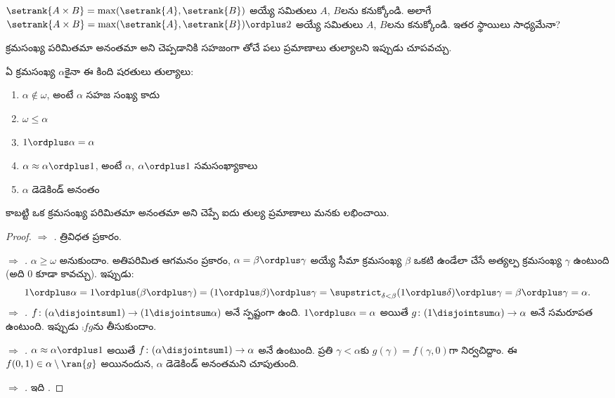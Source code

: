 \documentclass[../../../include/open-logic-section]{subfiles}
\begin{document}
\begin{prob}
$\setrank{A \times B}=
\max(\setrank{A}, \setrank{B})$ అయ్యే సమితులు $A$, $B$లను కనుక్కోండి. అలాగే $\setrank{A \times B}=\max(\setrank{A}, \setrank{B}) \ordplus  2$ అయ్యే సమితులు $A$, $B$లను కనుక్కోండి. ఇతర స్థాయిలు సాధ్యమేనా?
\end{prob}

క్రమసంఖ్య పరిమితమా అనంతమా అని చెప్పడానికి సహజంగా తోచే
పలు ప్రమాణాలు తుల్యాలని ఇప్పుడు చూపవచ్చు.

\begin{lem}
ఏ క్రమసంఖ్య $\alpha$కైనా ఈ కింది షరతులు తుల్యాలు:
\begin{enumerate}
	\item{} $\alpha\notin \omega$, అంటే $\alpha$ సహజ సంఖ్య కాదు
	\item{} $\omega \leq \alpha$
	\item{} $1 \ordplus  \alpha = \alpha$
	\item{} $\alpha \approx \alpha\ordplus 1$, అంటే $\alpha$, $\alpha\ordplus 1$ సమసంఖ్యాకాలు
	\item{} $\alpha$ డెడెకిండ్ అనంతం
	\end{enumerate}
\end{lem}
\noindent
కాబట్టి ఒక క్రమసంఖ్య పరిమితమా అనంతమా అని చెప్పే ఐదు తుల్య ప్రమాణాలు మనకు లభించాయి.

\begin{proof}
\emph{ $\Rightarrow$ .} త్రివిధత ప్రకారం.

\emph{ $\Rightarrow$ .} $\alpha \geq \omega$ అనుకుందాం. అతిపరిమిత ఆగమనం ప్రకారం,
$\alpha = \beta \ordplus \gamma$ అయ్యే సీమా క్రమసంఖ్య
$\beta$ ఒకటి ఉండేలా చేసే అత్యల్ప క్రమసంఖ్య $\gamma$
ఉంటుంది (అది $0$ కూడా కావచ్చు). ఇప్పుడు:
\[
	1 \ordplus \alpha =
	1 \ordplus (\beta \ordplus \gamma) =
	(1 \ordplus \beta) \ordplus \gamma =
	\supstrict_{\delta < \beta} (1 \ordplus  \delta) \ordplus  \gamma =
	\beta \ordplus  \gamma =
	\alpha.
\]
\emph{ $\Rightarrow$ .} $f \colon (\alpha \disjointsum 1) \to (1
\disjointsum \alpha)$ అనే  స్పష్టంగా ఉంది. $1 \ordplus \alpha = \alpha$ అయితే $g \colon (1 \disjointsum \alpha) \to \alpha$ అనే సమరూపత ఉంటుంది. ఇప్పుడు $\comp{f}{g}$ను తీసుకుందాం.

\emph{ $\Rightarrow$ .} $\alpha \approx \alpha \ordplus 1$ అయితే $f \colon (\alpha \disjointsum 1) \to \alpha$ అనే  ఉంటుంది. ప్రతి $\gamma < \alpha$కు $g(\gamma) = f(\gamma, 0)$గా నిర్వచిద్దాం. ఈ  $f(0,1) \in \alpha \setminus \ran{g}$ అయినందున, $\alpha$ డెడెకిండ్ అనంతమని చూపుతుంది.

\emph{ $\Rightarrow$ .} ఇది .
\end{proof}
\end{document}
